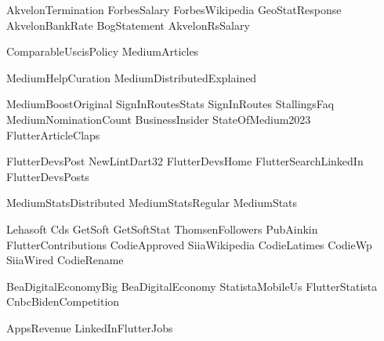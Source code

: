 {AkvelonTermination}
{ForbesSalary}
{ForbesWikipedia}
{GeoStatResponse}
{AkvelonBankRate}
{BogStatement}
{AkvelonRsSalary}

{ComparableUscisPolicy}
{MediumArticles}

{MediumHelpCuration}
{MediumDistributedExplained}

{MediumBoostOriginal}
{SignInRoutesStats}
{SignInRoutes}
{StallingsFaq}
{MediumNominationCount}
{BusinessInsider}
{StateOfMedium2023}
{FlutterArticleClaps}

{FlutterDevsPost}
{NewLintDart32}
{FlutterDevsHome}
{FlutterSearchLinkedIn}
{FlutterDevsPosts}

{MediumStatsDistributed}
{MediumStatsRegular}
{MediumStats}

{Lehasoft}
{Cds}
{GetSoft}
{GetSoftStat}
{ThomsenFollowers}
{PubAinkin}
{FlutterContributions}
{CodieApproved}
{SiiaWikipedia}
{CodieLatimes}
{CodieWp}
{SiiaWired}
{CodieRename}

{BeaDigitalEconomyBig}
{BeaDigitalEconomy}
{StatistaMobileUs}
{FlutterStatista}
{CnbcBidenCompetition}

{AppsRevenue}
{LinkedInFlutterJobs}
